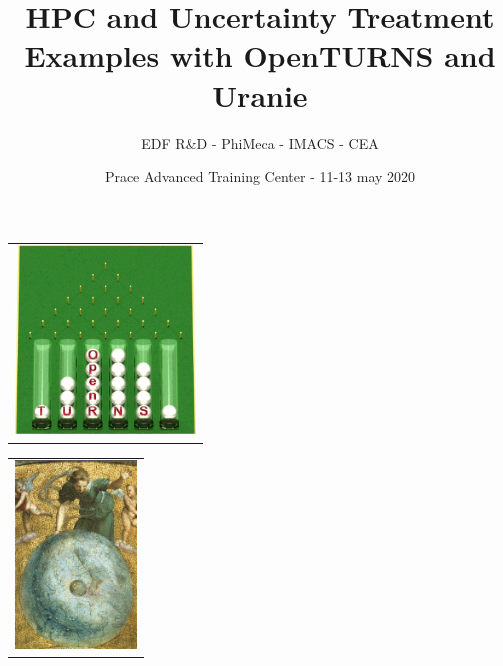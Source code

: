 \documentclass[11pt, french, A4wide]{article}
\title{HPC and Uncertainty Treatment \\
 Examples with OpenTURNS and Uranie}
\author{EDF R\&D - PhiMeca - IMACS - CEA}
\date{Prace Advanced Training Center - 11-13 may 2020}
\theoremstyle{remark}
\theoremstyle{definition}
\begin{document}
  \maketitle


\vspace*{2cm}


\begin{minipage}{8cm}
  \begin{center}
    \begin{tabular}{c}
\includegraphics[height=5cm]{logoOpenTURNS.jpg}
    \end{tabular}
  \end{center}
\end{minipage}
\hfill
\begin{minipage}{8cm}
  \begin{center}
    \begin{tabular}{c}
\includegraphics[height=5cm]{uranie_splash.png}
    \end{tabular}
  \end{center}
\end{minipage}

\vspace*{2cm}
\end{document}
